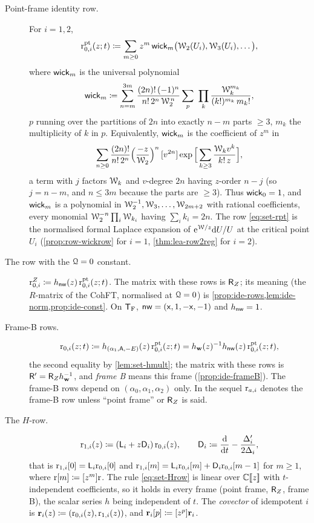 \begin{defn}[Rows]
\label{def:set-rows}
\begin{description}
\item[Point-frame identity row.] For $i=1,2$,
\begin{equation}
\label{eq:set-rpt}
\mathrm{r}^{\mathrm{pt}}_{0,i}(z;t)\coloneqq\sum_{m\geq0}z^m\,\mathsf{wick}_m\big(\mathcal{W}_2(U_i),\mathcal{W}_3(U_i),\ldots\big),
\end{equation}
where $\mathsf{wick}_m$ is the universal polynomial
\[
\wick_m\coloneqq\sum_{n=m}^{3m}\frac{(2n)!\,(-1)^n}{n!\,2^n\,\cW_2^{\,n}}\sum_{p}\ \prod_k\frac{\cW_k^{m_k}}{(k!)^{m_k}\,m_k!},
\]
$p$ running over the partitions of $2n$ into exactly $n-m$ parts $\geq3$, $m_k$ the multiplicity of $k$ in $p$. Equivalently, $\mathsf{wick}_m$ is the coefficient of $z^m$ in
\[
\sum_{n\geq0}\frac{(2n)!}{n!\,2^n}\Big(\frac{-z}{\mathcal{W}_2}\Big)^{n}\,[v^{2n}]\exp\Big[\sum_{k\geq3}\frac{\mathcal{W}_kv^k}{k!\,z}\Big],
\]
a term with $j$ factors $\mathcal{W}_k$ and $v$-degree $2n$ having $z$-order $n-j$ (so $j=n-m$, and $n\leq3m$ because the parts are $\geq3$). Thus $\mathsf{wick}_0=1$, and $\mathsf{wick}_m$ is a polynomial in $\mathcal{W}_2^{-1},\mathcal{W}_3,\ldots,\mathcal{W}_{2m+2}$ with rational coefficients, every monomial $\mathcal{W}_2^{-n}\prod_i\mathcal{W}_{k_i}$ having $\sum_ik_i=2n$. The row \eqref{eq:set-rpt} is the normalised formal Laplace expansion of $\mathrm{e}^{\mathcal{W}/z}\mathrm{d} U/U$ at the critical point $U_i$ (\cref{prop:row-wickrow} for $i=1$, \cref{thm:lea-row2reg} for $i=2$).
\item[The row with the $\mathcal{Q}=0$ constant.] $\mathrm{r}^{Z}_{0,i}\coloneqq h_{\mathsf{nw}}(z)\,\mathrm{r}^{\mathrm{pt}}_{0,i}(z;t)$. The matrix with these rows is $\mathsf{R}_{Z}$; its meaning (the $R$-matrix of the CohFT, normalised at $\mathcal{Q}=0$) is \cref{prop:ide-rows,lem:ide-norm,prop:ide-const}. On $\mathsf{T}_{\mathrm{F}}$, $\mathsf{nw}=(\mathsf{x},1,-\mathsf{x},-1)$ and $h_{\mathsf{nw}}=1$.
\item[Frame-B rows.]
\begin{equation}
\label{eq:set-rowB}
\mathrm{r}_{0,i}(z;t)\coloneqq h_{(\alpha_1,\mathsf{A},-E)}(z)\,\mathrm{r}^{\mathrm{pt}}_{0,i}(z;t)=h_{\mathbf{w}}(z)^{-1}h_{\mathsf{nw}}(z)\,\mathrm{r}^{\mathrm{pt}}_{0,i}(z;t),
\end{equation}
the second equality by \cref{lem:set-hmult}; the matrix with these rows is $\mathsf{R}'=\mathsf{R}_{Z}h_{\mathbf{w}}^{-1}$, and \emph{frame B} means this frame (\cref{prop:ide-frameB}). The frame-B rows depend on $(\alpha_0,\alpha_1,\alpha_2)$ only. In the sequel $\mathrm{r}_{a,i}$ denotes the frame-B row unless ``point frame'' or $\mathsf{R}_{Z}$ is said.
\item[The $H$-row.]
\begin{equation}
\label{eq:set-Hrow}
\mathrm{r}_{1,i}(z)\coloneqq(\mathsf{L}_i+z\mathsf{D}_i)\,\mathrm{r}_{0,i}(z),\qquad \mathsf{D}_i\coloneqq\frac{\mathrm{d}}{\mathrm{d} t}-\frac{\Delta_i'}{2\Delta_i},
\end{equation}
that is $\mathrm{r}_{1,i}[0]=\mathsf{L}_i\mathrm{r}_{0,i}[0]$ and $\mathrm{r}_{1,i}[m]=\mathsf{L}_i\mathrm{r}_{0,i}[m]+\mathsf{D}_i\mathrm{r}_{0,i}[m-1]$ for $m\geq1$, where $\mathrm{r}[m]\coloneqq[z^m]\mathrm{r}$. The rule \eqref{eq:set-Hrow} is linear over $\mathbb{C}[\![ z ]\!]$ with $t$-independent coefficients, so it holds in every frame (point frame, $\mathsf{R}_{Z}$, frame B), the scalar series $h$ being independent of $t$. The \emph{covector} of idempotent $i$ is $\mathbf{r}_i(z)\coloneqq(\mathrm{r}_{0,i}(z),\mathrm{r}_{1,i}(z))$, and $\mathbf{r}_i[p]\coloneqq[z^p]\mathbf{r}_i$.
\end{description}
\end{defn}

